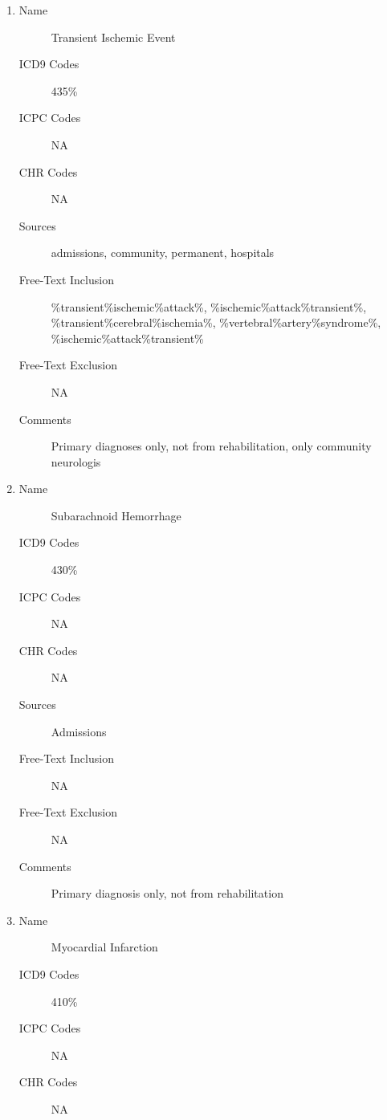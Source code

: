 \documentclass[a4paper,12pt]{article}
\begin{document}
\begin{appendices}
\begin{enumerate}
\begin{description}
   						\item[Free-Text Inclusion] NA
   						\item[Free-Text Exclusion] NA
   						\item[Comments] Primary diagnosis only, not from rehabilitation
   					\end{description}
   					\item 
   					\begin{description}
   						\item[Name] Transient Ischemic Event
   						\item[ICD9 Codes] 435\%
   						\item[ICPC Codes] NA
   						\item[CHR Codes] NA
   						\item[Sources] admissions, community, permanent, hospitals
   						\item[Free-Text Inclusion] \%transient\%ischemic\%attack\%, \%ischemic\%attack\%transient\%, \%transient\%cerebral\%ischemia\%, \%vertebral\%artery\%syndrome\%, \%ischemic\%attack\%transient\%
   						\item[Free-Text Exclusion] NA
   						\item[Comments] Primary diagnoses only, not from rehabilitation, only community neurologis
   					\end{description}
   					\item 
   					\begin{description}
   						\item[Name] Subarachnoid Hemorrhage
   						\item[ICD9 Codes] 430\%
   						\item[ICPC Codes] NA
   						\item[CHR Codes] NA
   						\item[Sources] Admissions
   						\item[Free-Text Inclusion] NA
   						\item[Free-Text Exclusion] NA
   						\item[Comments] Primary diagnosis only, not from rehabilitation
   					\end{description}
   					\item 
   					\begin{description}
   						\item[Name] Myocardial Infarction
   						\item[ICD9 Codes] 410\%
   						\item[ICPC Codes] NA
   						\item[CHR Codes] NA

\end{description}
\end{enumerate}
\end{appendices}
\end{document}
